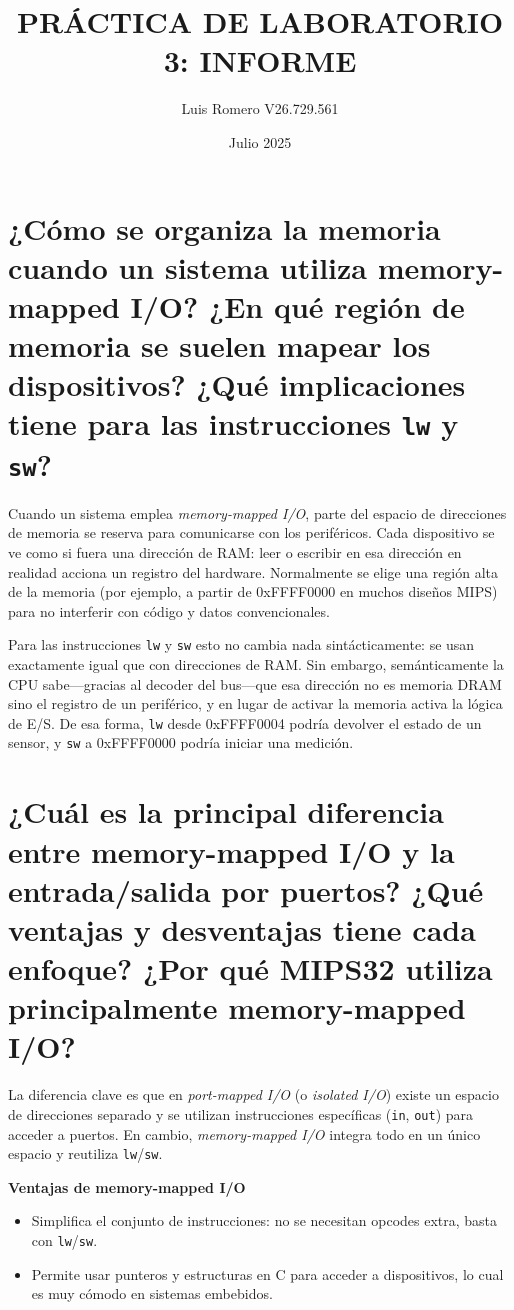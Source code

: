 \documentclass{article}
\title{PRÁCTICA DE LABORATORIO 3: INFORME}
\author{Luis Romero V26.729.561}
\date{Julio 2025}
\begin{document}
\maketitle

\begingroup
\raggedright

\section{¿Cómo se organiza la memoria cuando un sistema utiliza memory-mapped I/O? ¿En qué región de memoria se suelen mapear los dispositivos? ¿Qué implicaciones tiene para las instrucciones \texttt{lw} y \texttt{sw}?}

Cuando un sistema emplea \emph{memory-mapped I/O}, parte del espacio de direcciones de memoria se reserva para comunicarse con los periféricos. Cada dispositivo se ve como si fuera una dirección de RAM: leer o escribir en esa dirección en realidad acciona un registro del hardware. Normalmente se elige una región alta de la memoria (por ejemplo, a partir de 0xFFFF0000 en muchos diseños MIPS) para no interferir con código y datos convencionales. 

Para las instrucciones \texttt{lw} y \texttt{sw} esto no cambia nada sintácticamente: se usan exactamente igual que con direcciones de RAM. Sin embargo, semánticamente la CPU sabe—gracias al decoder del bus—que esa dirección no es memoria DRAM sino el registro de un periférico, y en lugar de activar la memoria activa la lógica de E/S. De esa forma, \texttt{lw} desde 0xFFFF0004 podría devolver el estado de un sensor, y \texttt{sw} a 0xFFFF0000 podría iniciar una medición.

\section{¿Cuál es la principal diferencia entre memory-mapped I/O y la entrada/salida por puertos? ¿Qué ventajas y desventajas tiene cada enfoque? ¿Por qué MIPS32 utiliza principalmente memory-mapped I/O?}

La diferencia clave es que en \emph{port-mapped I/O} (o \emph{isolated I/O}) existe un espacio de direcciones separado y se utilizan instrucciones específicas (\texttt{in}, \texttt{out}) para acceder a puertos. En cambio, \emph{memory-mapped I/O} integra todo en un único espacio y reutiliza \texttt{lw}/\texttt{sw}.

\textbf{Ventajas de memory-mapped I/O}  
\begin{itemize}
  \item Simplifica el conjunto de instrucciones: no se necesitan opcodes extra, basta con \texttt{lw}/\texttt{sw}.  
  \item Permite usar punteros y estructuras en C para acceder a dispositivos, lo cual es muy cómodo en sistemas embebidos.  
\end{itemize}
\end{document}
